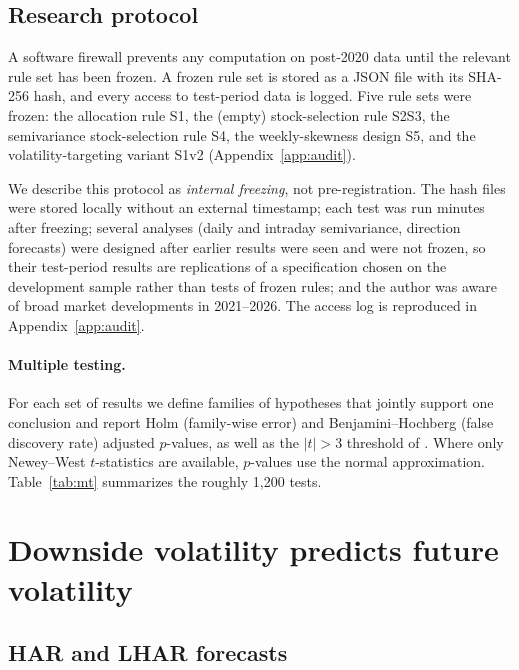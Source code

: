 \documentclass[11pt]{article}
\begin{document}
\subsection{Research protocol}\label{sec:protocol}

A software firewall prevents any computation on post-2020 data until the relevant rule set has been frozen. A frozen rule set is stored as a JSON file with its SHA-256 hash, and every access to test-period data is logged. Five rule sets were frozen: the allocation rule S1, the (empty) stock-selection rule S2S3, the semivariance stock-selection rule S4, the weekly-skewness design S5, and the volatility-targeting variant S1v2 (Appendix~\ref{app:audit}).

We describe this protocol as \emph{internal freezing}, not pre-registration. The hash files were stored locally without an external timestamp; each test was run minutes after freezing; several analyses (daily and intraday semivariance, direction forecasts) were designed after earlier results were seen and were not frozen, so their test-period results are replications of a specification chosen on the development sample rather than tests of frozen rules; and the author was aware of broad market developments in 2021--2026. The access log is reproduced in Appendix~\ref{app:audit}.

\paragraph{Multiple testing.} For each set of results we define families of hypotheses that jointly support one conclusion and report Holm (family-wise error) and Benjamini--Hochberg (false discovery rate) adjusted $p$-values, as well as the $|t|>3$ threshold of \citet{hlz2016}. Where only Newey--West $t$-statistics are available, $p$-values use the normal approximation. Table~\ref{tab:mt} summarizes the roughly 1,200 tests.

\section{Downside volatility predicts future volatility}\label{sec:vol}

\subsection{HAR and LHAR forecasts}
\end{document}
